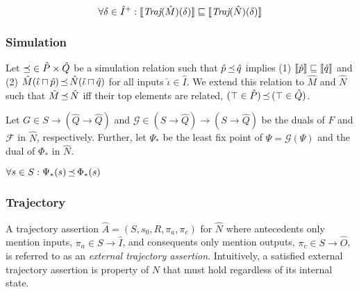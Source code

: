 \begin{equation*}
\forall \delta \in \hat I^{+} : \llbracket\textit{Traj}(\hat M)(\delta)\rrbracket \sqsubseteq \llbracket\textit{Traj}(\hat N)(\delta)\rrbracket
\end{equation*}


\subsubsection{Simulation} Let $\operatorname{\mathrel{\preceq}} \in \hat P \times \hat Q$ be a simulation relation such that $\hat p \operatorname{\mathrel{\preceq}} \hat q$ implies (1) $\llbracket\hat p\rrbracket \sqsubseteq \llbracket\hat q\rrbracket$ and (2) $\hat M(\hat \iota \sqcap \hat p) \operatorname{\mathrel{\preceq}} \hat N(\hat \iota \sqcap \hat q)$ for all inputs $\hat \iota \in \hat I$. We extend this relation to $\hat M$ and $\hat N$ such that $\hat M \operatorname{\mathrel{\preceq}} \hat N$ iff their top elements are related, $(\top \in \hat P) \operatorname{\mathrel{\preceq}} \, (\top \in \hat Q)$.






Let $G \in S \rightarrow (\hat Q \rightarrow \hat Q)$ and $\mathcal{G} \in (S \rightarrow \hat Q) \rightarrow (S \rightarrow \hat Q)$ be the duals of $F$ and $\mathcal{F}$ in $\hat N$, respectively. Further, let $\Psi_{*}$ be the least fix point of $\Psi = \mathcal{G}(\Psi)$ and the dual of $\Phi_{*}$ in $\hat N$.

\begin{lemma}
$\forall s \in S : \Psi_{*}(s) \operatorname{\mathrel{\preceq}} \Phi_{*}(s)$
\end{lemma}

\subsubsection{Trajectory} A trajectory assertion $\hat A = (S,s_{0},R,\pi_{a},\pi_{c})$ for $\hat N$ where antecedents only mention inputs, $\pi_{a} \in S \rightarrow \hat I$, and consequents only mention outputs, $\pi_{c} \in S \rightarrow \hat O$, is referred to as an \textit{external trajectory assertion}. Intuitively, a satisfied external trajectory assertion is property of $N$ that must hold regardless of its internal state.

